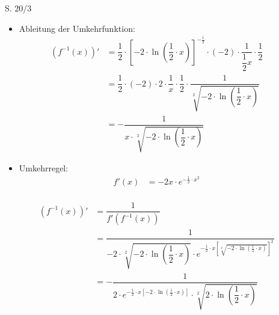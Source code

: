 \begin{Exercise}{S. 20/3}{}
\begin{enumerate}
\begin{enumerate}[label=\alph*)]
{\begin{itemize}[leftmargin=*]
{\begin{align*}
                            y_{1,2} &= \pm \sqrt[2]{-2 \cdot \ln(\dfrac{1}{2} \cdot x)} &&
                        \end{align*}\\[-1.0ex]
                        $\Rightarrow \quad f^{-1}(x) = - \sqrt[2]{-2 \cdot \ln(\dfrac{1}{2} \cdot x)}$ \ auf \ $\left] \ -\infty; 0 \ \right[ \phantom{\sqrt[2]{\ln(\dfrac{1}{2})}}$\\[1.0ex]
                        $\Rightarrow \quad f^{-1}(x) = \sqrt[2]{-2 \cdot \ln(\dfrac{1}{2} \cdot x)}$ \ auf \ $\left] \ 0; \infty \ \right[$\\[-2.0ex]
                        }
                    \item Ableitung der Umkehrfunktion: \\[-2.0ex]{
                        \begin{align*}
                            \left(f^{-1}(x)\right)' &= \dfrac{1}{2} \cdot \left[-2 \cdot \ln(\dfrac{1}{2} \cdot x)\right]^{-\frac{1}{2}} \cdot (-2) \cdot \dfrac{1}{\dfrac{1}{2}x} \cdot \dfrac{1}{2} && \\[1.5ex]
                            &= \dfrac{1}{2} \cdot (-2) \cdot 2 \cdot \dfrac{1}{x} \cdot \dfrac{1}{2} \cdot \dfrac{1}{\sqrt[2]{-2 \cdot \ln(\dfrac{1}{2} \cdot x)}}&&\\[1.5ex]
                            &= -\dfrac{1}{x \cdot \sqrt[2]{-2 \cdot \ln(\dfrac{1}{2} \cdot x)}} &&
                        \end{align*}
                        }
                    \item Umkehrregel: \\[-2.0ex]{
                        \begin{align*}
                            f'(x) &= -2x \cdot e^{-\frac{1}{2}\cdot x^2} && 
                        \end{align*}\\[-2.0ex]
                        \begin{align*}
                            \left(f^{-1}(x)\right)' &= \dfrac{1}{f'(f^{-1}(x))} && \\[2.0ex]
                            &= \dfrac{1}{-2 \cdot \sqrt[2]{-2 \cdot \ln(\dfrac{1}{2} \cdot x)} \cdot e^{-\frac{1}{2}\cdot x\left[\sqrt[2]{-2 \cdot \ln(\frac{1}{2} \cdot x)}\right]^2}} &&\\[2.0ex]
                            &= -\dfrac{1}{2 \cdot e^{-\frac{1}{2}\cdot x\left[-2 \cdot \ln(\frac{1}{2} \cdot x)\right]} \cdot \sqrt[2]{2 \cdot \ln(\dfrac{1}{2} \cdot x)}} &&\\[2.0ex]

\end{align*}}
\end{itemize}}
\end{enumerate}
\end{enumerate}
\end{Exercise}
